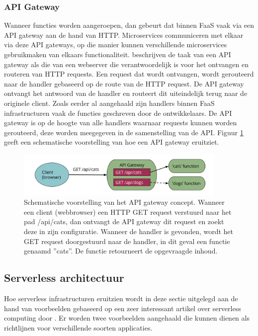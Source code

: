 \subsubsection{API Gateway}
Wanneer functies worden aangeroepen, dan gebeurt dat binnen FaaS vaak via een API gateway aan de hand van HTTP. Microservices communiceren met elkaar via deze API gateways, op die manier kunnen verschillende microservices gebruikmaken van elkaars functionaliteit.
\textcite{Roberts2017} beschrijven de taak van een API gateway als die van een webserver die verantwoordelijk is voor het ontvangen en routeren van HTTP requests. Een request dat wordt ontvangen, wordt gerouteerd naar de handler gebaseerd op de route van de HTTP request. De API gateway ontvangt het antwoord van de handler en routeert dit uiteindelijk terug naar de originele client. Zoals eerder al aangehaald zijn handlers binnen FaaS infrastructuren vaak de functies geschreven door de ontwikkelaars. De API gateway is op de hoogte van alle handlers waarnaar requests kunnen worden gerouteerd, deze worden meegegeven in de samenstelling van de API. Figuur \ref{fig:api-gateway} geeft een schematische voorstelling van hoe een API gateway eruitziet.
 
 \begin{figure}
    \centering
    \includegraphics[width=0.9\textwidth]{img/api_gateway.png}
    \caption{Schematische voorstelling van het API gateway concept. Wanneer een client (webbrowser) een HTTP GET request verstuurd naar het pad /api/cats, dan ontvangt de API gateway dit request en zoekt deze in zijn configuratie. Wanneer de handler is gevonden, wordt het GET request doorgestuurd naar de handler, in dit geval een functie genaamd ''cats''.  De functie retourneert de opgevraagde inhoud. \autocite{Roberts2018}} 
    \label{fig:api-gateway}  
\end{figure}


\subsection{Serverless architectuur}
Hoe serverless infrastructuren eruitzien wordt in deze sectie uitgelegd aan de hand van voorbeelden gebaseerd op een zeer interessant artikel over serverless computing door \textcite{Roberts2018}. Er worden twee voorbeelden aangehaald die kunnen dienen als richtlijnen voor verschillende soorten applicaties.

